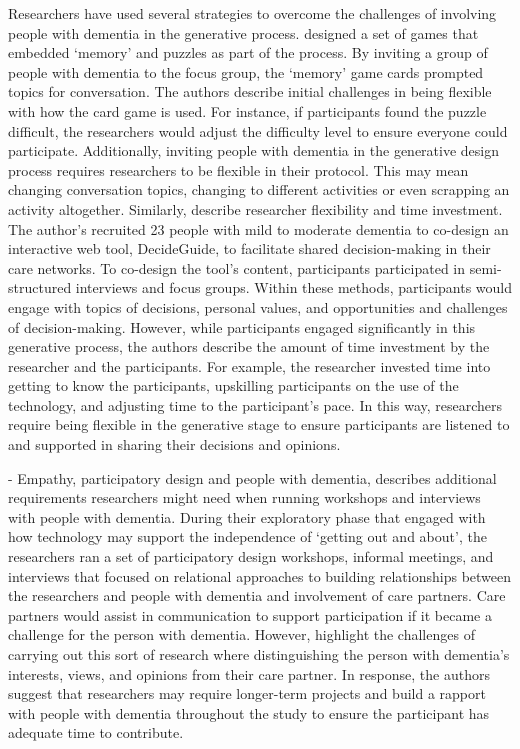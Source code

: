 Researchers have used several strategies to overcome the challenges of involving people with dementia in the generative process. \cite{mayer2013lessons} designed a set of games that embedded `memory' and puzzles as part of the process. By inviting a group of people with dementia to the focus group, the `memory' game cards prompted topics for conversation. The authors describe initial challenges in being flexible with how the card game is used. For instance, if participants found the puzzle difficult, the researchers would adjust the difficulty level to ensure everyone could participate. Additionally, inviting people with dementia in the generative design process requires researchers to be flexible in their protocol. This may mean changing conversation topics, changing to different activities or even scrapping an activity altogether. Similarly, \cite{span2015interactive} describe researcher flexibility and time investment. The author's recruited 23 people with mild to moderate dementia to co-design an interactive web tool, DecideGuide, to facilitate shared decision-making in their care networks. To co-design the tool's content, participants participated in semi-structured interviews and focus groups. Within these methods, participants would engage with topics of decisions, personal values, and opportunities and challenges of decision-making. However, while participants engaged significantly in this generative process, the authors describe the amount of time investment by the researcher and the participants. For example, the researcher invested time into getting to know the participants, upskilling participants on the use of the technology, and adjusting time to the participant's pace. In this way, researchers require being flexible in the generative stage to ensure participants are listened to and supported in sharing their decisions and opinions.

\cite{lindsay_empathy_2012} - Empathy, participatory design and people with dementia, describes additional requirements researchers might need when running workshops and interviews with people with dementia. During their exploratory phase that engaged with how technology may support the independence of `getting out and about', the researchers ran a set of participatory design workshops, informal meetings, and interviews that focused on relational approaches to building relationships between the researchers and people with dementia and involvement of care partners. Care partners would assist in communication to support participation if it became a challenge for the person with dementia. However, \cite{lindsay_empathy_2012} highlight the challenges of carrying out this sort of research where distinguishing the person with dementia's interests, views, and opinions from their care partner. In response, the authors suggest that researchers may require longer-term projects and build a rapport with people with dementia throughout the study to ensure the participant has adequate time to contribute.

